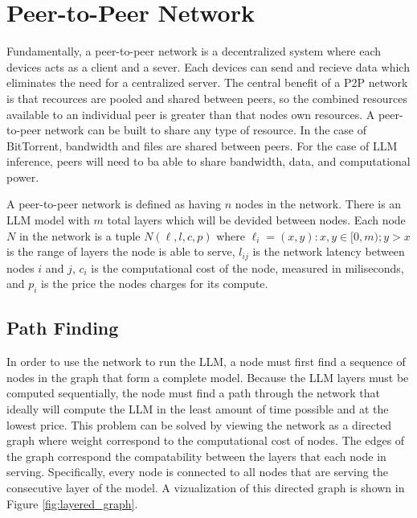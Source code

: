 \documentclass[preprint,twoside,11pt]{article}
\begin{document}
\section{Peer-to-Peer Network}

Fundamentally, a peer-to-peer network is a decentralized system where each devices acts as a client and a sever.
Each devices can send and recieve data which eliminates the need for a centralized server. The central benefit of a P2P network
is that recources are pooled and shared between peers, so the combined resources available to an individual peer is greater than that nodes own resources.
A peer-to-peer network can be built to share any type of resource. In the case of BitTorrent, bandwidth and files are shared between peers.
For the case of LLM inference, peers will need to ba able to share bandwidth, data, and computational power.

A peer-to-peer network is defined as having $n$ nodes in the network. There is an LLM model with $m$ total layers which will be devided between nodes.
Each node $N$ in the network is a tuple $N(\ell, l, c, p)$ where $\ell _i = (x,y) : x,y \in [0,m); y > x$ is the range of layers the node is able to serve, $l_{ij}$ is the network latency between nodes $i$ and $j$,
$c_i$ is the computational cost of the node, measured in miliseconds, and $p_i$ is the price the nodes charges for its compute.

\subsection{Path Finding}

In order to use the network to run the LLM, a node must first find a sequence of nodes in the graph that form a complete model.
Because the LLM layers must be computed sequentially, the node must find a path through the network that ideally will compute
the LLM in the least amount of time possible and at the lowest price. This problem can be solved by viewing the network as a directed graph where weight correspond
to the computational cost of nodes. The edges of the graph correspond the compatability between the layers that each node in serving.
Specifically, every node is connected to all nodes that are serving the consecutive layer of the model. A vizualization of this directed graph is shown in Figure \ref{fig:layered_graph}.
\end{document}
